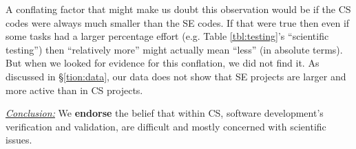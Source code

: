 \documentclass[sigconf,review,anonymous]{acmart}
\newcommand{\ei}{\end{itemize}}
\newenvironment{RQ}{\vspace{1mm}\begin{tcolorbox}[enhanced,width=3.4in,size=fbox,colback=red!5!white,drop shadow southeast,sharp corners]}{\end{tcolorbox}}
\begin{document}
A conflating factor that might make us doubt this observation would be if the CS codes were always much smaller than the SE codes. If that were true then even if some tasks had a larger percentage effort 
(e.g. Table \ref{tbl:testing}'s ``scientific testing'') then  ``relatively more'' might actually
mean ``less'' (in absolute terms). 
But when we looked for evidence for this conflation, we did not find it.
As discussed in \S\ref{tion:data},
our data does not show that  SE projects are larger and more active
than in CS projects.





\begin{RQ}
\textit{\underline{Conclusion:}}
We \textbf{endorse} the belief that within CS, software development's verification and validation, are difficult and mostly concerned with scientific issues. 
\end{RQ} 

\end{document}
